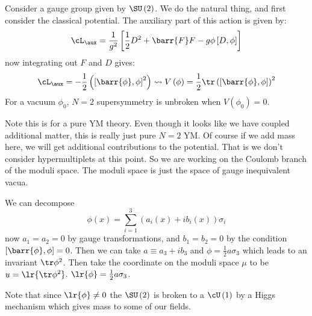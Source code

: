 \documentclass{booc}
\begin{document}
Consider a gauge group given by $\SU\left( 2 \right)$.
We do the natural thing, and first consider the classical potential. 
The auxiliary part of this action is given by:
\begin{equation}
\cL_{\aux} = \frac{1}{g^2}\left[ 
\frac{1}{2} D^2 + \barr{F}F - g\phi\left[ D , \phi \right]
\right]
\end{equation}
now integrating out $F$ and $D$ gives:
\begin{equation}
\cL_{\aux} = -\frac{1}{2} \left( \left[ \barr{\phi} , \phi \right]^2 \right)
\leadsto V\left( \phi \right) = \frac{1}{2}\tr\left( \left[ \barr{\phi} , \phi \right] \right)^2
\end{equation}
For a vacuum $\phi_0$, $N = 2$ supersymmetry is unbroken when 
$V\left( \phi_0 \right) = 0$.

Note this is for a pure YM theory. 
Even though it looks like we have coupled additional matter, this is really just
pure $N =2$ YM. Of course if we add mass here, we will get additional contributions to the 
potential.
That is we don't consider hypermultiplets at this point.
So we are working on the Coulomb branch of the moduli space.
The moduli space is just the space of gauge inequivalent vacua.

We can decompose
\begin{equation}
\phi\left( x \right) = 
\sum_{i = 1}^3 \left( a_i\left( x \right) + ib_i\left( x \right) \right) \sigma_i
\end{equation}
now $a_1 = a_2 = 0$ by gauge transformations, and $b_1 = b_2 = 0$
by the condition $\left[ \barr{\phi} , \phi \right] = 0$.
Then we can take $a \equiv a_3 + i b_3$ and $\phi = \frac{1}{2} a\sigma_3$
which leads to an invariant $\tr \phi^2$.
Then take the coordinate on the moduli space $\mu$ to be 
$u = \lr{\tr \phi^2}$.
$\lr{\phi} = \frac{1}{2} a \sigma_3$.

\begin{rmk}
Note that since $\lr{\phi}\neq 0$
the $\SU\left( 2 \right)$ is broken to a $\cU\left( 1 \right)$ 
by a Higgs mechanism which gives mass to some of our fields.
\end{rmk}
\end{document}
